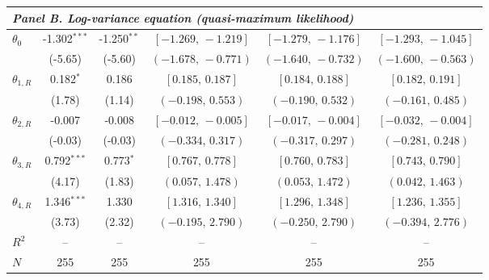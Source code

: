 \documentclass[11pt]{article}
\begin{document}
\begin{table}[!htbp]
\begin{threeparttable}
\begin{tabular}{lccccc}
\midrule
\multicolumn{6}{l}{\textit{Panel B. Log-variance equation (quasi-maximum likelihood)}} \\
\midrule
$\theta_0$ & -1.302$^{***}$ & -1.250$^{**}$ & $[-1.269,\,-1.219]$ & $[-1.279,\,-1.176]$ & $[-1.293,\,-1.045]$ \\
 & (-5.65) & (-5.60) & $(-1.678,\,-0.771)$ & $(-1.640,\,-0.732)$ & $(-1.600,\,-0.563)$ \\
\midrule
$\theta_{1,R}$ & 0.182$^{*}$ & 0.186 & $[0.185,\,0.187]$ & $[0.184,\,0.188]$ & $[0.182,\,0.191]$ \\
 & (1.78) & (1.14) & $(-0.198,\,0.553)$ & $(-0.190,\,0.532)$ & $(-0.161,\,0.485)$ \\
$\theta_{2,R}$ & -0.007 & -0.008 & $[-0.012,\,-0.005]$ & $[-0.017,\,-0.004]$ & $[-0.032,\,-0.004]$ \\
 & (-0.03) & (-0.03) & $(-0.334,\,0.317)$ & $(-0.317,\,0.297)$ & $(-0.281,\,0.248)$ \\
$\theta_{3,R}$ & 0.792$^{***}$ & 0.773$^{*}$ & $[0.767,\,0.778]$ & $[0.760,\,0.783]$ & $[0.743,\,0.790]$ \\
 & (4.17) & (1.83) & $(0.057,\,1.478)$ & $(0.053,\,1.472)$ & $(0.042,\,1.463)$ \\
$\theta_{4,R}$ & 1.346$^{***}$ & 1.330 & $[1.316,\,1.340]$ & $[1.296,\,1.348]$ & $[1.236,\,1.355]$ \\
 & (3.73) & (2.32) & $(-0.195,\,2.790)$ & $(-0.250,\,2.790)$ & $(-0.394,\,2.776)$ \\
\midrule
$R^2$ & -- & -- & -- & -- & -- \\
$N$ & 255 & 255 & 255 & 255 & 255 \\
\bottomrule
\end{tabular}
\begin{tablenotes}[flushleft]
\scriptsize

\end{tablenotes}
\end{threeparttable}
\end{table}
\end{document}
